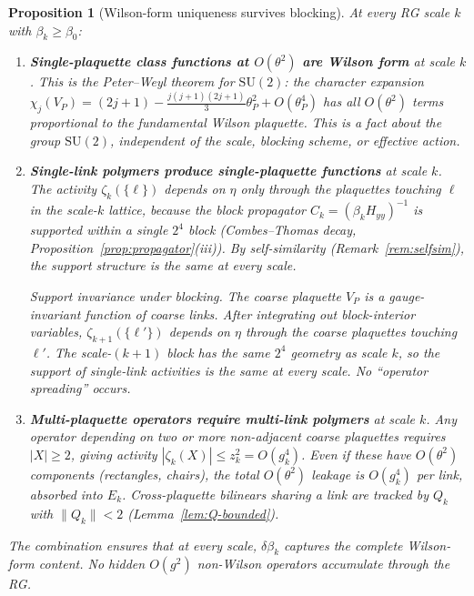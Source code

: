 \documentclass[11pt]{article}
\newtheorem{proposition}[theorem]{Proposition}
\theoremstyle{definition}
\newcommand{\SU}{\mathrm{SU}}
\begin{document}
\begin{proposition}[Wilson-form uniqueness survives blocking]%
\label{prop:wilson-survives}
At every RG scale $k$ with $\beta_k\ge\beta_0$:
\begin{enumerate}[nosep,label=\textup{(\roman*)}]
\item \textbf{Single-plaquette class functions at $O(\theta^2)$
are Wilson form} at scale $k$.
This is the Peter--Weyl theorem for $\SU(2)$: the character
expansion $\chi_j(V_P)=(2j+1)-\frac{j(j+1)(2j+1)}{3}\theta_P^2
+O(\theta_P^4)$ has all $O(\theta^2)$ terms proportional
to the fundamental Wilson plaquette.
This is a fact about the \emph{group} $\SU(2)$, independent
of the scale, blocking scheme, or effective action.

\item \textbf{Single-link polymers produce single-plaquette
functions} at scale $k$.
The activity $\zeta_k(\{\ell\})$ depends on $\eta$ only
through the plaquettes touching $\ell$ in the scale-$k$
lattice, because the block propagator $C_k=(\beta_k H_{yy})^{-1}$
is supported within a single $2^4$ block
\textup{(}Combes--Thomas decay,
Proposition~\ref{prop:propagator}(iii)\textup{)}.
By self-similarity \textup{(}Remark~\ref{rem:selfsim}\textup{)},
the support structure is the same at every scale.

\emph{Support invariance under blocking.}
The coarse plaquette $V_P$ is a gauge-invariant function of
coarse links.  After integrating out block-interior variables,
$\zeta_{k+1}(\{\ell'\})$ depends on $\eta$ through the
coarse plaquettes touching $\ell'$.  The scale-$(k{+}1)$
block has the same $2^4$ geometry as scale $k$, so the
support of single-link activities is the same at every scale.
No ``operator spreading'' occurs.

\item \textbf{Multi-plaquette operators require multi-link
polymers} at scale $k$.
Any operator depending on two or more non-adjacent coarse
plaquettes requires $|X|\ge 2$, giving activity
$|\zeta_k(X)|\le z_k^2=O(g_k^4)$.
Even if these have $O(\theta^2)$ components (rectangles,
chairs), the total $O(\theta^2)$ leakage is $O(g_k^4)$
per link, absorbed into $E_k$.
Cross-plaquette bilinears sharing a link are tracked by
$Q_k$ with $\|Q_k\|<2$ \textup{(}Lemma~\ref{lem:Q-bounded}\textup{)}.
\end{enumerate}
The combination ensures that at every scale, $\delta\beta_k$
captures the complete Wilson-form content.  No hidden $O(g^2)$
non-Wilson operators accumulate through the RG.
\end{proposition}
\end{document}
